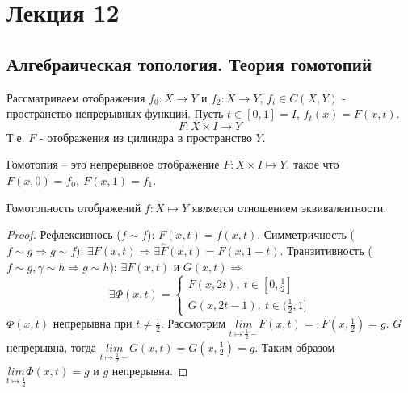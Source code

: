 \section {Лекция 12}




\subsection{Алгебраическая топология. Теория гомотопий}


Рассматриваем отображения $f_0: X \rightarrow Y$ и $f_2: X \rightarrow Y$, $f_i \in C(X, Y)$ - пространство непрерывных функций. Пусть $t \in [0, 1] = I$, $f_t(x) = F(x, t)$.
\[
    F: X \times I \rightarrow Y
\]
Т.е. $F$ - отображения из цилиндра в пространство $Y$. %

\begin{definition}
    Гомотопия -- это непрерывное отображение $F:X\times I \mapsto Y$, такое что $F(x,0) = f_0,\ F(x,1)  = f_1$.
\end{definition}

\begin{statement}
    Гомотопность отображений $f:X\mapsto Y$  является отношением эквивалентности.
\end{statement}
\begin{proof}
    Рефлексивнось ($f \sim f$): $F(x, t) = f(x, t)$. Симметричность ($f \sim g \Rightarrow g \sim f$): $\exists F(x, t) \Rightarrow \exists \overset{\sim}{F}(x,t) = F(x, 1- t)$. Транзитивность ($f \sim g, \gamma \sim h\Rightarrow g \sim h$): $\exists F(x, t)$ и $G(x, t) \Rightarrow $ 
    $$\exists \Phi(x, t) = \begin{cases}
        F(x, 2t),\ t \in [0, \frac{1}{2}]\\
        G(x, 2t - 1),\ t \in (\frac{1}{2}, 1]
    \end{cases}$$
    $\Phi(x, t)$ непрерывна при $t \neq \frac{1}{2}$. Рассмотрим $\underset{t\mapsto \frac{1}{2}-}{lim} F(x,t) =: F(x, \frac{1}{2}) = g$. $G$ непрерывна, тогда $\underset{t\mapsto \frac{1}{2}+}{lim} G(x, t) = G(x, \frac{1}{2}) = g$. Таким образом $\underset{t\mapsto \frac{1}{2}}{lim} \Phi(x, t) = g$ и $g$ непрерывна. 
\end{proof}

